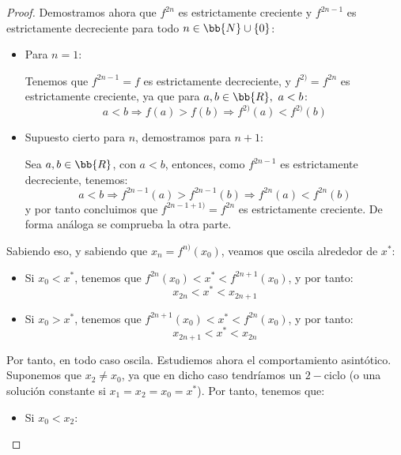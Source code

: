 \begin{ejercicio*}
\begin{proof}
    Demostramos ahora que $f^{2n}$ es estrictamente creciente y $f^{2n-1}$ es estrictamente decreciente para todo $n\in \bb{N}\cup \{0\}$:
    \begin{itemize}
        \item Para $n=1$:

        Tenemos que $f^{2n-1}=f$ es estrictamente decreciente, y $f^{2)}=f^{2n}$ es estrictamente creciente, ya que para $a,b\in \bb{R},~a<b$:
        \begin{equation*}
            a<b\Longrightarrow f(a)>f(b) \Longrightarrow f^{2)}(a)<f^{2)}(b)
        \end{equation*}

        \item Supuesto cierto para $n$, demostramos para $n+1$:

        Sea $a,b\in \bb{R}$, con $a<b$, entonces, como $f^{2n-1}$ es estrictamente decreciente, tenemos:
        \begin{equation*}
            a<b\Longrightarrow f^{2n-1}(a)>f^{2n-1}(b) \Longrightarrow f^{2n}(a)<f^{2n}(b)
        \end{equation*}
        y por tanto concluimos que $f^{2n-1+1)}=f^{2n}$ es estrictamente creciente. De forma análoga se comprueba la otra parte.
    \end{itemize}

    Sabiendo eso, y sabiendo que $x_{n}=f^{n)}(x_0)$, veamos que oscila alrededor de $x^\ast$:
    \begin{itemize}
        \item Si $x_0<x^\ast$, tenemos que $f^{2n}(x_0)<x^\ast < f^{2n+1}(x_0)$, y por tanto:
        \begin{equation*}
            x_{2n} < x^\ast < x_{2n+1}
        \end{equation*}

        \item Si $x_0>x^\ast$, tenemos que $f^{2n+1}(x_0)<x^\ast < f^{2n}(x_0)$, y por tanto:
        \begin{equation*}
            x_{2n+1} < x^\ast < x_{2n}
        \end{equation*}
    \end{itemize}

    Por tanto, en todo caso oscila. Estudiemos ahora el comportamiento asintótico. Suponemos que $x_2\neq x_0$, ya que en dicho caso tendríamos un $2-$ciclo (o una solución constante si $x_1=x_2=x_0=x^\ast$). Por tanto, tenemos que:
    \begin{itemize}
        \item Si $x_0<x_2$:


\end{itemize}
\end{proof}
\end{ejercicio*}
